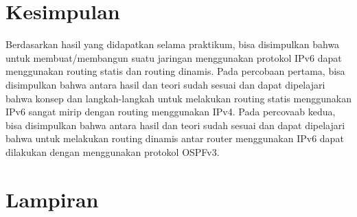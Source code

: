 \section{Kesimpulan}
Berdasarkan hasil yang didapatkan selama praktikum, bisa disimpulkan bahwa untuk membuat/membangun suatu jaringan menggunakan protokol IPv6 dapat menggunakan routing statis dan routing dinamis. Pada percobaan pertama, bisa disimpulkan bahwa antara hasil dan teori sudah sesuai dan dapat dipelajari bahwa konsep dan langkah-langkah untuk melakukan routing statis menggunakan IPv6 sangat mirip dengan routing menggunakan IPv4. Pada percovaab kedua, bisa disimpulkan bahwa antara hasil dan teori sudah sesuai dan dapat dipelajari bahwa untuk melakukan routing dinamis antar router menggunakan IPv6 dapat dilakukan dengan menggunakan protokol OSPFv3.

\section{Lampiran}
